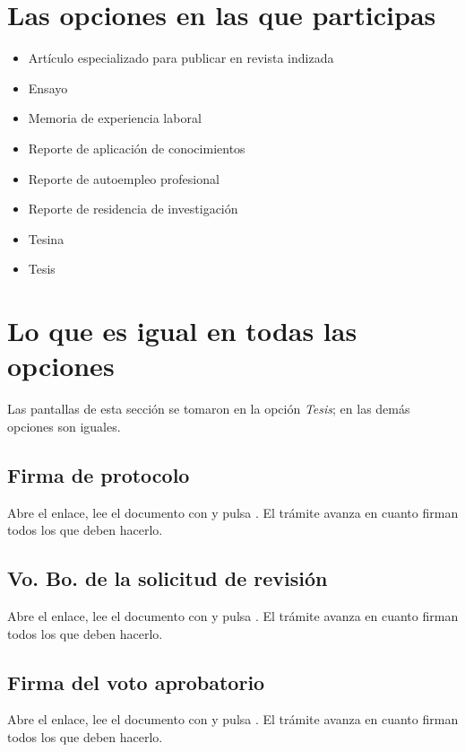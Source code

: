 \section{Las opciones en las que participas}
\begin{itemize}
  \item Artículo especializado para publicar en revista indizada
  \item Ensayo
  \item Memoria de experiencia laboral
  \item Reporte de aplicación de conocimientos
  \item Reporte de autoempleo profesional
  \item Reporte de residencia de investigación
  \item Tesina
  \item Tesis
\end{itemize}
\section{Lo que es igual en todas las opciones}
Las pantallas de esta sección se tomaron en la opción \emph{Tesis}; en las demás opciones son iguales.
\subsection{Firma de protocolo}
Abre el enlace, lee el documento con  y pulsa . El trámite avanza en cuanto firman todos los que deben hacerlo.
\subsection{Vo. Bo. de la solicitud de revisión}
Abre el enlace, lee el documento con  y pulsa . El trámite avanza en cuanto firman todos los que deben hacerlo.
\subsection{Firma del voto aprobatorio}
Abre el enlace, lee el documento con  y pulsa . El trámite avanza en cuanto firman todos los que deben hacerlo.
